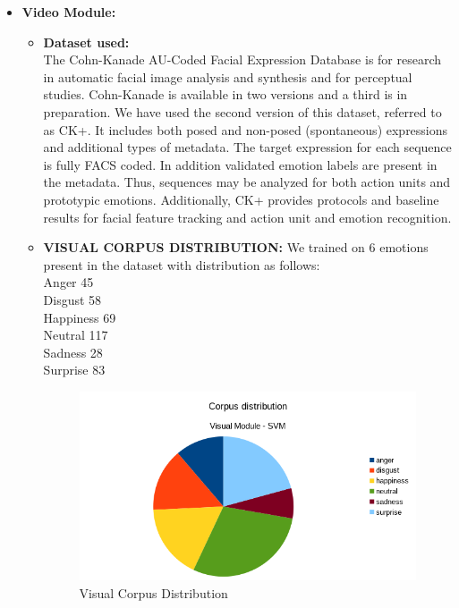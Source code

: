 \documentclass[oneside,a4paper,12pt]{report}
\begin{document}
\begin{normalsize}
\begin{itemize}
		\item \textbf{Video Module: }
	\begin{itemize}
		\item \textbf{Dataset used:}\\
		\hspace{15mm}The Cohn-Kanade AU-Coded Facial Expression Database is for research in automatic facial image analysis and synthesis and for perceptual studies. Cohn-Kanade is available in two versions and a third is in preparation.
		\hspace{15mm}We have used the second version of this dataset, referred to as CK+. It includes both posed and non-posed (spontaneous) expressions and additional types of metadata. The target expression for each sequence is fully FACS coded. In addition validated emotion labels are present in the metadata. Thus, sequences may be analyzed for both action units and prototypic emotions. Additionally, CK+ provides protocols and baseline results for facial feature tracking and action unit and emotion recognition. 
		\newline
		\item \textbf{VISUAL CORPUS DISTRIBUTION:}
		We trained on 6 emotions present in the dataset with distribution as follows:\\
		Anger 45\\
		Disgust 58\\
		Happiness 69\\
		Neutral 117\\
		Sadness 28\\
		Surprise 83\\
		
		\begin{center}
			\begin{figure}[!htbp]
				\centering
				\includegraphics[width=\textwidth]{visual-corpus-distribution.png}
				\caption{Visual Corpus Distribution}
				\label{fig:visual_corpus_dist}
			\end{figure}
		\end{center}
		

\end{itemize}
\end{itemize}
\end{normalsize}
\end{document}
